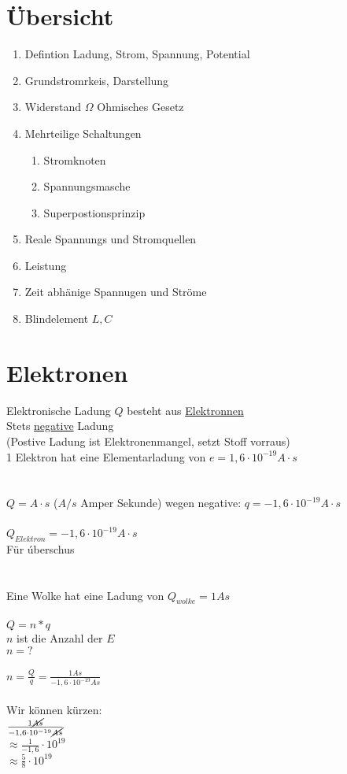 \section{Übersicht}
\begin{enumerate}
  \item Defintion Ladung, Strom, Spannung, Potential
  \item Grundstromrkeis, Darstellung
  \item Widerstand $\Omega$ Ohmisches Gesetz
  \item Mehrteilige Schaltungen
  \begin{enumerate}[label*=\arabic*.]
    \item Stromknoten
    \item Spannungsmasche
    \item Superpostionsprinzip
  \end{enumerate}
  \item Reale Spannungs und Stromquellen
  \item Leistung
  \item Zeit abhänige Spannugen und Ströme
  \item Blindelement $L,C$
\end{enumerate}


\section{Elektronen}

Elektronische Ladung $Q$ besteht aus \underline{Elektronnen}\\
Stets \underline{negative} Ladung \\
(Postive Ladung ist Elektronenmangel, setzt Stoff vorraus)\\
1 Elektron hat eine Elementarladung von $e = 1,6 \cdot 10^{-19} A \cdot s$\\
\\
\\
$ Q = A \cdot s $ ($A/s$  Amper Sekunde) wegen negative: $q = -1,6 \cdot 10^{-19} A \cdot s$\\
\\
$Q_{Elektron} = -1,6 \cdot 10^{-19} A \cdot s$\\
Für úberschus\\
\\
\\
Eine Wolke hat eine Ladung von $Q_{wolke} = 1 As$\\
\\
$ Q = n * q$\\
$n$ ist die Anzahl der $E$\\
$n = ? $\\
\\
$n = \frac{Q}{q} = \frac{1 As}{-1,6 \cdot 10^{-19} As}$\\
\\
Wir können kürzen:\\
$\frac{1 \cancel{As}}{-1,6 \cdot 10^{-19} \cancel{As}}$\\
$\approx \frac{1}{-1,6} \cdot 10^{19}$\\
$\approx \frac{5}{8} \cdot 10^{19}$\\
\\

